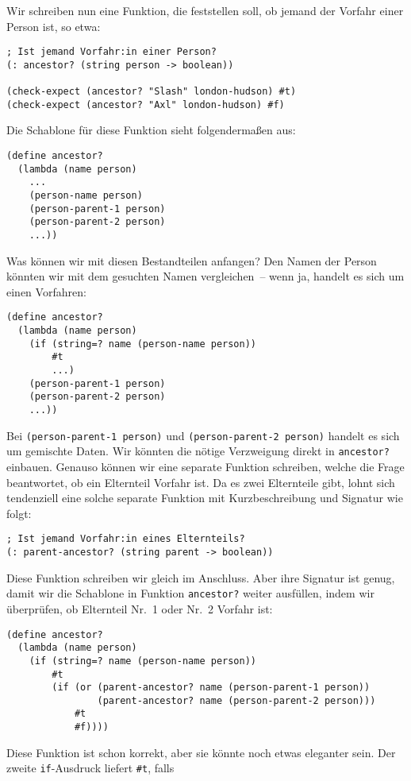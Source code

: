 %
Wir schreiben nun eine Funktion, die feststellen soll, ob jemand der
Vorfahr einer Person ist, so etwa:
%
\begin{lstlisting}
; Ist jemand Vorfahr:in einer Person?
(: ancestor? (string person -> boolean))

(check-expect (ancestor? "Slash" london-hudson) #t)
(check-expect (ancestor? "Axl" london-hudson) #f)
\end{lstlisting}
%
Die Schablone für diese Funktion sieht folgendermaßen aus:
%
\begin{lstlisting}
(define ancestor?
  (lambda (name person)
    ...
    (person-name person)
    (person-parent-1 person)
    (person-parent-2 person)
    ...))
\end{lstlisting}
%
Was können wir mit diesen Bestandteilen anfangen?  Den Namen der
Person könnten wir mit dem gesuchten Namen vergleichen~-- wenn ja,
handelt es sich um einen Vorfahren:
%
\begin{lstlisting}
(define ancestor?
  (lambda (name person)
    (if (string=? name (person-name person))
        #t
        ...)
    (person-parent-1 person)
    (person-parent-2 person)
    ...))
\end{lstlisting}
%
Bei \lstinline{(person-parent-1 person)} und
\lstinline{(person-parent-2 person)} handelt es sich um gemischte
Daten.  Wir könnten die nötige Verzweigung direkt in
\lstinline{ancestor?} einbauen.  Genauso können wir eine separate
Funktion schreiben, welche die Frage beantwortet, ob ein Elternteil
Vorfahr ist.  Da es zwei Elternteile gibt, lohnt sich tendenziell eine
solche separate Funktion mit Kurzbeschreibung und Signatur wie folgt:
%
\begin{lstlisting}
; Ist jemand Vorfahr:in eines Elternteils?
(: parent-ancestor? (string parent -> boolean))
\end{lstlisting}
%
Diese Funktion schreiben wir gleich im Anschluss.  Aber ihre Signatur
ist genug, damit wir die Schablone in Funktion \lstinline{ancestor?}
weiter ausfüllen, indem wir überprüfen, ob Elternteil Nr.~1 oder Nr.~2
Vorfahr ist:
%
\begin{lstlisting}
(define ancestor?
  (lambda (name person)
    (if (string=? name (person-name person))
        #t
        (if (or (parent-ancestor? name (person-parent-1 person))
                (parent-ancestor? name (person-parent-2 person)))
            #t
            #f))))
\end{lstlisting}
%
Diese Funktion ist schon korrekt, aber sie könnte noch etwas eleganter
sein.  Der zweite \lstinline{if}-Ausdruck liefert \lstinline{#t}, falls
